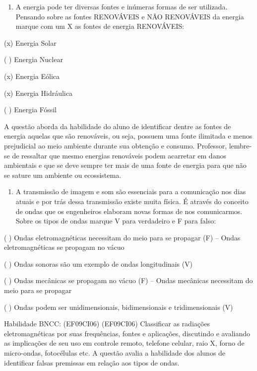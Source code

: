 \begin{enumerate}
\def\labelenumi{\arabic{enumi}.}
\item
  A energia pode ter diversas fontes e inúmeras formas de ser utilizada.
  Pensando sobre as fontes RENOVÁVEIS e NÃO RENOVÁVEIS da energia marque
  com um X as fontes de energia RENOVÁVEIS:
\end{enumerate}

(x) Energia Solar

( ) Energia Nuclear

(x) Energia Eólica

(x) Energia Hidráulica

( ) Energia Fóssil

A questão aborda da habilidade do aluno de identificar dentre as fontes
de energia aquelas que são renováveis, ou seja, possuem uma fonte
ilimitada e menos prejudicial ao meio ambiente durante sua obtenção e
consumo. Professor, lembre-se de ressaltar que mesmo energias renováveis
podem acarretar em danos ambientais e que se deve sempre ter mais de uma
fonte de energia para que não se sature um ambiente ou ecossistema.

\begin{enumerate}
\def\labelenumi{\arabic{enumi}.}
\item
  A transmissão de imagem e som são essenciais para a comunicação nos
  dias atuais e por trás dessa transmissão existe muita física. É
  através do conceito de ondas que os engenheiros elaboram novas formas
  de nos comunicarmos. Sobre os tipos de ondas marque V para verdadeiro
  e F para falso:
\end{enumerate}

( ) Ondas eletromagnéticas necessitam do meio para se propagar (F) --
Ondas eletromagnéticas se propagam no vácuo

( ) Ondas sonoras são um exemplo de ondas longitudinais (V)

( ) Ondas mecânicas se propagam no vácuo (F) -- Ondas mecânicas
necessitam do meio para se propagar

( ) Ondas podem ser unidimensionais, bidimensionais e tridimensionais
(V)

Habilidade BNCC: (EF09CI06) (EF09CI06) Classificar as radiações
eletromagnéticas por suas frequências, fontes e aplicações, discutindo e
avaliando as implicações de seu uso em controle remoto, telefone
celular, raio X, forno de micro-ondas, fotocélulas etc. A questão avalia
a habilidade dos alunos de identificar falsas premissas em relação aos
tipos de ondas.

